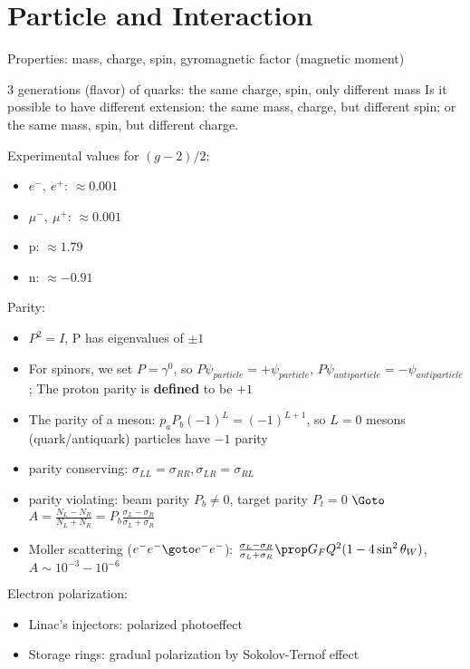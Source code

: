 \section{Particle and Interaction}
Properties: mass, charge, spin, gyromagnetic factor (magnetic moment)

3 generations (flavor) of quarks: the same charge, spin, only different mass
Is it possible to have different extension: the same mass, charge, but different spin; or the same mass, spin, but different charge.

Experimental values for $(g-2)/2$:
\begin{itemize}
    \item $e^-, \ e^+$: $\approx 0.001$
    \item $\mu^-, \ \mu^+$: $\approx 0.001$
    \item p: $\approx 1.79$
    \item n: $\approx -0.91$
\end{itemize}

Parity:
\begin{itemize}
    \item $P^2 = I$, P has eigenvalues of $\pm 1$
    \item For spinors, we set $P = \gamma^0$, so $P\psi_{particle} = +\psi_{particle}$, $P\psi_{antiparticle} = -\psi_{antiparticle}$;
    The proton parity is \textbf{defined} to be $+1$
\item The parity of a meson: $p_a P_b (-1)^{L} = (-1)^{L+1}$, so $L=0$ mesons (quark/antiquark) particles have $-1$ parity
    \item parity conserving: $\sigma_{LL} = \sigma_{RR}, \sigma_{LR} = \sigma_{RL}$
    \item parity violating: beam parity $P_b \ne 0$, target parity $P_t = 0$ $\Goto$ $A = \frac{N_L - N_R}{N_L + N_R} = P_b \frac{\sigma_L - \sigma_R}{\sigma_L + \sigma_R}$
    \item Moller scattering ($e^- e^- \goto e^- e^-$): $\frac{\sigma_L - \sigma_R}{\sigma_L + \sigma_R} \prop G_F Q^2 ( 1- 4\sin^2\theta_W)$, $A \sim 10^{-3} - 10^{-6}$
\end{itemize}

Electron polarization:
\begin{itemize}
    \item Linac's injectors: polarized photoeffect
    \item Storage rings: gradual polarization by Sokolov-Ternof effect
\end{itemize}
